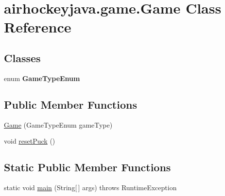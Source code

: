 \hypertarget{classairhockeyjava_1_1game_1_1_game}{}\section{airhockeyjava.\+game.\+Game Class Reference}
\label{classairhockeyjava_1_1game_1_1_game}
\subsection*{Classes}
\begin{DoxyCompactItemize}
\item 
enum {\bfseries Game\+Type\+Enum}
\end{DoxyCompactItemize}
\subsection*{Public Member Functions}
\begin{DoxyCompactItemize}
\item 
\hyperlink{classairhockeyjava_1_1game_1_1_game_aadf8d97f46cd5cb01fd963deb0b83cd7}{Game} (Game\+Type\+Enum game\+Type)
\item 
void \hyperlink{classairhockeyjava_1_1game_1_1_game_a85cb5cd81d9260d059b194760261f3ab}{reset\+Puck} ()
\end{DoxyCompactItemize}
\subsection*{Static Public Member Functions}
\begin{DoxyCompactItemize}
\item 
static void \hyperlink{classairhockeyjava_1_1game_1_1_game_a17982e0ebc2cd5c1b982c43c5b1e038e}{main} (String\mbox{[}$\,$\mbox{]} args)  throws Runtime\+Exception 
\end{DoxyCompactItemize}
